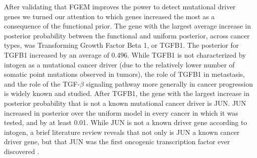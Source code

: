 After validating that FGEM improves the power to detect mutational driver genes we turned our attention to which genes increased the most as a consequence of the functional prior.  The gene with the largest average increase in posterior probability between the functional and uniform posterior, across cancer types, was Transforming Growth Factor Beta 1, or TGFB1.  The posterior for TGFB1 increased by an average of 0.496. %
While TGFB1 is not characterized by intogen as a mutational cancer driver (due to the relatively lower number of somatic point mutations observed in tumors), the role of TGFB1 in metastasis, and the role of the TGF-$\beta$ signaling pathway more generally in cancer progression is widely known and studied\cite{TGF_Zhao_2018}.  %
After TGFB1, the gene with the largest increase in posterior probability that is not a known mutational cancer driver is JUN.  %
JUN increased in posterior over the uniform model in every cancer in which it was tested, and by at least 0.01.  %
While JUN is not a known driver gene according to intogen, a brief literature review reveals that not only is JUN a known cancer driver gene, but that JUN was the first oncogenic transcription factor ever discovered \cite{Vogt_2002}.  

